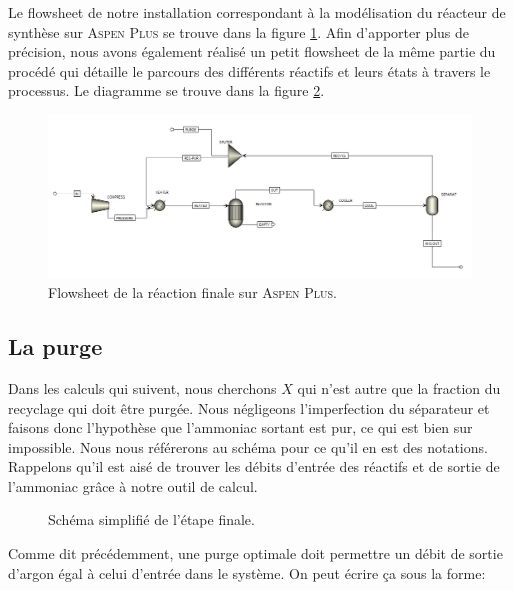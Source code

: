 \documentclass[a4paper, oneside, 12pt]{article}
\begin{document}
Le flowsheet de notre installation correspondant à la modélisation 
du réacteur de synthèse sur \textsc{Aspen Plus} 
se trouve dans la figure \ref{fig:flow_aspen}.
Afin d'apporter plus de précision, nous avons également réalisé un petit 
flowsheet de la même partie du procédé qui détaille le parcours des 
différents réactifs et leurs états à travers le processus.
Le diagramme se trouve dans la figure \ref{fig:flow_synthese}.

\begin{figure}[h!]
	\begin{center}
		\includegraphics[scale=0.45,angle=90]{img_aspen/Flowsheet_ASPEN.jpg}
	\end{center}
	\caption{Flowsheet de la réaction finale sur \textsc{Aspen Plus}.}
	\label{fig:flow_aspen}
\end{figure}

\subsection{La purge}

Dans les calculs qui suivent, nous cherchons $X$ qui n'est autre que 
la fraction du recyclage qui doit être purgée. 
Nous négligeons l'imperfection du séparateur et faisons donc l'hypothèse 
que l'ammoniac sortant est pur, ce qui est bien sur impossible. 
Nous nous référerons au schéma pour ce qu'il en est des notations. 
Rappelons qu'il est aisé de trouver les débits d'entrée des réactifs 
et de sortie de l'ammoniac grâce à notre outil de calcul.

\begin{figure}[h!]
	\begin{center}
		
	\end{center}
	\caption{Schéma simplifié de l'étape finale.}
	\label{fig:flow_synthese}
\end{figure}

Comme dit précédemment, une purge optimale doit permettre un débit 
de sortie d'argon égal à celui d'entrée dans le système. 
On peut écrire ça sous la forme:
\end{document}
